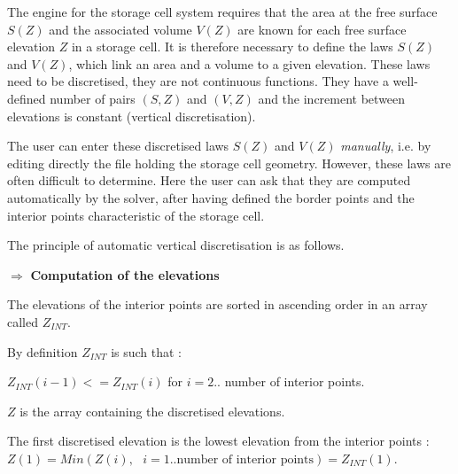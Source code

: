 The engine for the storage cell system requires that the area at the free surface $S(Z)$ and the associated volume $V(Z)$ are known for each free surface elevation $Z$ in a storage cell. It is therefore necessary to define the laws $S(Z)$ and $V(Z)$, which link an area and a volume to a given elevation. These laws need to be discretised, they are not continuous functions. They have a well-defined number of pairs $(S,Z)$ and $(V,Z)$ and the increment between elevations is constant (vertical discretisation). 

\vspace{0.5cm}

The user can enter these discretised laws $S(Z)$ and $V(Z)$ \textit{manually}, i.e. by editing directly the file holding the storage cell geometry. However, these laws are often difficult to determine. Here the user can ask that they are computed automatically by the solver, after having defined the border points and the interior points characteristic of the storage cell.

\vspace{0.5cm}

The principle of automatic vertical discretisation is as follows.

\vspace{0.5cm}

$\Longrightarrow$ \textbf{Computation of the elevations}

\vspace{0.5cm}

The elevations of the interior points are sorted in ascending order in an array called $Z_{INT}$.

\vspace{0.5cm}

By definition $Z_{INT}$ is such that :

$Z_{INT}(i-1) <= Z_{INT}(i)$ for $i=2..$ number of interior points.

\vspace{0.5cm}

$Z$ is the array containing the discretised elevations.

\vspace{0.5cm}

The first discretised elevation is the lowest elevation from the interior points : \\
$Z(1) = Min(Z(i),\mbox{ }i=1..\mbox{number of interior points}) = Z_{INT}(1)$.

\vspace{0.5cm}

